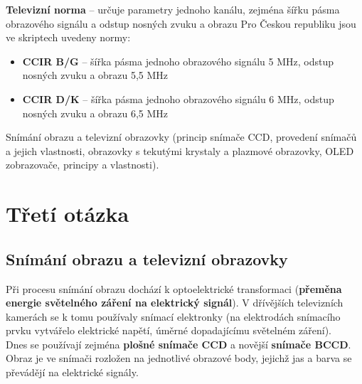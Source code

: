 \textbf{Televizní norma} -- určuje parametry jednoho kanálu, zejména šířku pásma obrazového signálu a odstup nosných zvuku a obrazu
Pro Českou republiku jsou ve skriptech uvedeny normy:
\begin{itemize}
	\item \textbf{CCIR B/G} -- šířka pásma jednoho obrazového signálu 5 MHz, odstup nosných zvuku a obrazu 5,5 MHz 
	\item \textbf{CCIR D/K} -- šířka pásma jednoho obrazového signálu 6 MHz, odstup nosných zvuku a obrazu 6,5 MHz 
\end{itemize}


Snímání obrazu a televizní obrazovky (princip snímače CCD, provedení snímačů a jejich vlastnosti, obrazovky s tekutými krystaly a plazmové obrazovky, OLED zobrazovače, principy a vlastnosti).
\chapter{Třetí otázka}
\section{Snímání obrazu a televizní obrazovky}
Při procesu snímání obrazu dochází k optoelektrické transformaci (\textbf{přeměna energie světelného záření na elektrický signál}). V dřívějších televizních kamerách se k tomu používaly snímací elektronky (na elektrodách snímacího prvku vytvářelo elektrické napětí, úměrné dopadajícímu světelném záření).\\
Dnes se používají zejména \textbf{plošné snímače CCD} a novější \textbf{snímače BCCD}. Obraz je ve snímači rozložen na jednotlivé obrazové body, jejichž jas a barva se převádějí na elektrické signály.

